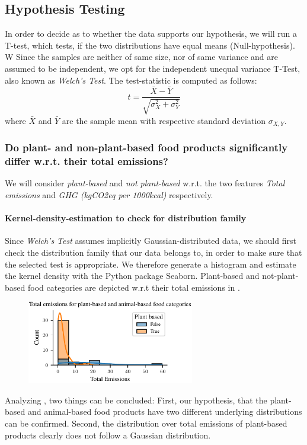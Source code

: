 \documentclass{article}
\begin{document}
\subsection*{Hypothesis Testing}
In order  to decide as to whether the data supports our hypothesis, we will run a T-test, which tests, if the two distributions have equal means (Null-hypothesis). W Since the samples are neither of same size, nor of same variance and are assumed to be independent, we opt for the independent unequal variance T-Test, also known as \textit{Welch's Test}. %
The test-statistic is computed as follows:
\begin{equation}\label{eq:t-test}
  t = \frac{\bar{X}-\bar{Y}}{\sqrt{\sigma^2_{X}+\sigma^2_{Y}}}
\end{equation}
where $\bar{X}$ and  $\bar{Y}$ are the sample mean with respective standard deviation $\sigma_{X,Y}$.

\subsubsection*{Do plant- and non-plant-based food products significantly differ w.r.t. their total emissions?}


 We will consider \textit{plant-based} and \textit{not plant-based} w.r.t.  the two features \textit{Total emissions} and \textit{GHG (kgCO2eq per 1000kcal)} respectively.
\paragraph*{Kernel-density-estimation to check for distribution family} Since \textit{Welch's Test} assumes implicitly Gaussian-distributed data, we should first check the distribution family that  our data belongs to, in order to make sure that the selected test is appropriate. We therefore generate a histogram and estimate the kernel density with the Python package Seaborn. Plant-based and not-plant-based food categories are depicted w.r.t their total emissions in .
\begin{figure}[h]\label{fig:emissions}
  \centering
  \includegraphics[width=0.65\textwidth]{figures/emissions.pdf}
  \label{fig:emissions}
\end{figure}
Analyzing , two things can be concluded: First, our hypothesis, that the plant-based and animal-based food products have two different underlying distributions can be confirmed. Second, the distribution over total emissions of plant-based products clearly does not follow a Gaussian distribution. 
\end{document}
